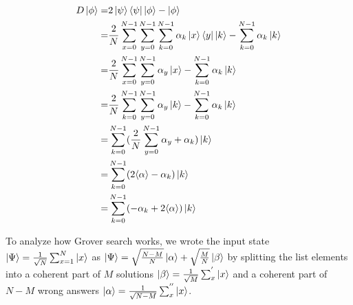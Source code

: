 \documentclass[12pt]{article}
\begin{document}
\begin{enumerate}
          \begin{align}
              D\ket{\phi} = & 2\ket{\psi}\bra{\psi}\ket{\phi}-\ket{\phi}                                                                               \\
              =             & \frac{2}{N}\sum_{x=0}^{N-1}\sum_{y=0}^{N-1}\sum_{k=0}^{N-1}\alpha_k\ket{x}\bra{y}\ket{k}-\sum_{k=0}^{N-1}\alpha_k\ket{k} \\
              =             & \frac{2}{N}\sum_{x=0}^{N-1}\sum_{y=0}^{N-1}\alpha_y\ket{x}-\sum_{k=0}^{N-1}\alpha_k\ket{k}                               \\
              =             & \frac{2}{N}\sum_{k=0}^{N-1}\sum_{y=0}^{N-1}\alpha_y\ket{k}-\sum_{k=0}^{N-1}\alpha_k\ket{k}                               \\
              =             & \sum_{k=0}^{N-1}(\frac{2}{N}\sum_{y=0}^{N-1}\alpha_y+\alpha_k)\ket{k}                                                    \\
              =             & \sum_{k=0}^{N-1}(2\langle\alpha\rangle-\alpha_k)\ket{k}                                                                  \\
              =             & \sum_{k=0}^{N-1}(-\alpha_k+2\langle\alpha\rangle)\ket{k}
          \end{align}





\end{enumerate}


To analyze how Grover search works, we wrote the input state $\ket{\Psi} = \frac{1}{\sqrt{N}}\sum_{x=1}^{N} \ket{x}$ as $\ket{\Psi} = \sqrt{\frac{N-M}{N}}\ket{\alpha} + \sqrt{\frac{M}{N}}\ket{\beta}$ by splitting the list elements into a coherent part of $M$ solutions $\ket{\beta} = \frac{1}{\sqrt{M}}\sum_{x}^{'} \ket{x}$ and a coherent part of $N-M$ wrong answers $\ket{\alpha} = \frac{1}{\sqrt{N-M}}\sum_{x}^{''} \ket{x}$.
\end{document}
